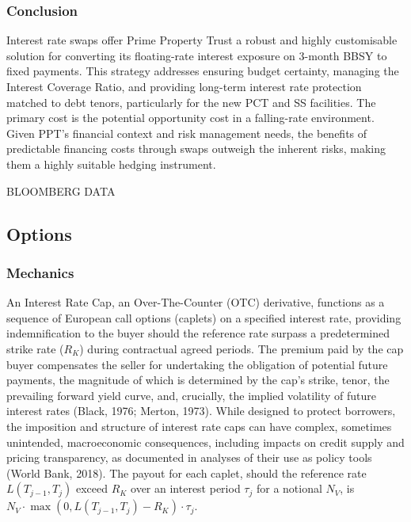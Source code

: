 \documentclass[11pt, a4paper, british]{article}
\begin{document}
\subsubsection{Conclusion}
Interest rate swaps offer Prime Property Trust a robust and highly customisable solution for converting its floating-rate interest exposure on 3-month BBSY to fixed payments. This strategy addresses ensuring budget certainty, managing the Interest Coverage Ratio, and providing long-term interest rate protection matched to debt tenors, particularly for the new PCT and SS facilities. The primary cost is the potential opportunity cost in a falling-rate environment. Given PPT's financial context and risk management needs, the benefits of predictable financing costs through swaps outweigh the inherent risks, making them a highly suitable hedging instrument.

BLOOMBERG DATA



\newpage

\subsection{Options}

\subsubsection{Mechanics}
An Interest Rate Cap, an Over-The-Counter (OTC) derivative, functions as a sequence of European call options (caplets) on a specified interest rate, providing indemnification to the buyer should the reference rate surpass a predetermined strike rate ($R_K$) during contractual agreed periods. The premium paid by the cap buyer compensates the seller for undertaking the obligation of potential future payments, the magnitude of which is determined by the cap's strike, tenor, the prevailing forward yield curve, and, crucially, the implied volatility of future interest rates (Black, 1976; Merton, 1973). While designed to protect borrowers, the imposition and structure of interest rate caps can have complex, sometimes unintended, macroeconomic consequences, including impacts on credit supply and pricing transparency, as documented in analyses of their use as policy tools (World Bank, 2018). The payout for each caplet, should the reference rate $L(T_{j-1}, T_j)$ exceed $R_K$ over an interest period $\tau_j$ for a notional $N_V$, is $N_V \cdot \max(0, L(T_{j-1}, T_j) - R_K) \cdot \tau_j$.
\end{document}
